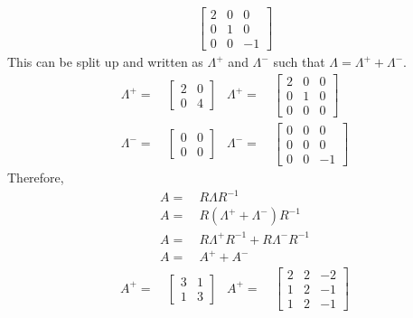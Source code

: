 \documentclass[11pt]{article}
\newcommand{\bra}[1]{\left(#1\right)}
\begin{document}
\begin{enumerate}
\begin{enumerate}
\begin{align*}
\begin{bmatrix}
        2 & 0 & 0\\
        0 & 1 & 0\\
        0 & 0 & -1
        \end{bmatrix}
      \end{align*}
      This can be split up and written as $\Lambda^{+}$ and $\Lambda^{-}$ such that $\Lambda = \Lambda^+ + \Lambda^-$.
      \begin{align*}
          \Lambda^{+} =& \ 
          \begin{bmatrix}
          2 & 0 \\
          0 & 4
          \end{bmatrix} & 
          \Lambda^{+} =& \
          \begin{bmatrix}
          2 & 0 & 0 \\
          0 & 1 & 0 \\
          0 & 0 & 0 
          \end{bmatrix} \\
          \Lambda^{-} =& \ 
          \begin{bmatrix}
          0 & 0 \\
          0 & 0
          \end{bmatrix} & 
          \Lambda^{-} =& \ 
          \begin{bmatrix}
          0 & 0 & 0 \\
          0 & 0 & 0 \\
          0 & 0 & -1
          \end{bmatrix}
      \end{align*}
      Therefore, 
      \begin{align*}
          A =& \ R\Lambda R^{-1} \\
          A =& \ R\bra{\Lambda^+ + \Lambda^-}R^{-1} \\
          A =& \ R\Lambda^{+}R^{-1} + R\Lambda^{-}R^{-1} \\
          A =& \ A^{+} + A^{-}
      \end{align*}
      \begin{align*}
          A^{+} =& \ 
          \begin{bmatrix}
          3 & 1 \\
          1 & 3
          \end{bmatrix} & 
          A^{+} =& \ 
          \begin{bmatrix}
          2 & 2 & -2 \\
          1 & 2 & -1 \\
          1 & 2 & -1
          \end{bmatrix} \\

\end{align*}
\end{enumerate}
\end{enumerate}
\end{document}
